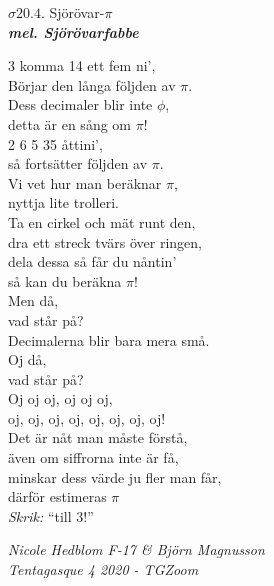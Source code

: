 \documentclass[a6paper,10pt]{article}
\newcommand{\mel}[1]{\small\textbf{\textit{mel. #1 \\}}}
\begin{document}
\begin{center}
\Large $\sigma20.4$. Sjörövar-$\pi$\\
\mel{Sjörövarfabbe} 
\end{center}
\small 3 komma 14 ett fem ni',\\
Börjar den långa följden av $\pi$.\\
Dess decimaler blir inte $\phi$,\\
detta är en sång om $\pi$!
\vspace{5pt}\\
2 6 5 35 åttini',\\
så fortsätter följden av $\pi$.\\
Vi vet hur man beräknar $\pi$,\\
nyttja lite trolleri.
\vspace{5pt}\\
Ta en cirkel och mät runt den,\\
dra ett streck tvärs över ringen,\\
dela dessa så får du nåntin’\\
så kan du beräkna $\pi$!
\vspace{5pt}\\
Men då,\\
vad står på?\\
Decimalerna blir bara mera små.\\
Oj då,\\
vad står på?\\
Oj oj oj, oj oj oj,\\
oj, oj, oj, oj, oj, oj, oj, oj!
\vspace{5pt}\\
Det är nåt man måste förstå,\\
även om siffrorna inte är få,\\
minskar dess värde ju fler man får,\\
därför estimeras $\pi$ 
\vspace{5pt}\\
\textit{Skrik:} “till 3!”

\begin{flushright}
\textit{Nicole Hedblom F-17 \& Björn Magnusson \\Tentagasque 4 2020 - TGZoom}
\end{flushright}

\setlength{\oddsidemargin}{-0.47in}
\end{document}
